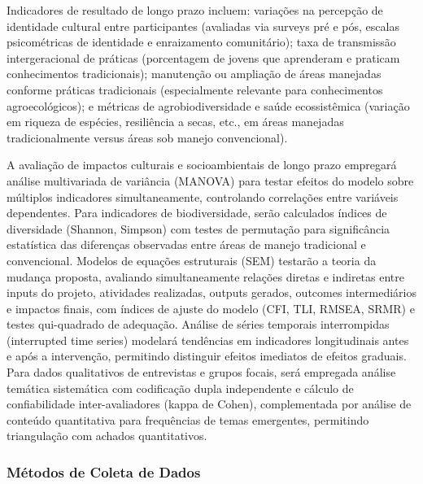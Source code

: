 Indicadores de resultado de longo prazo incluem: variações na percepção de identidade cultural entre participantes (avaliadas via surveys pré e pós, escalas psicométricas de identidade e enraizamento comunitário); taxa de transmissão intergeracional de práticas (porcentagem de jovens que aprenderam e praticam conhecimentos tradicionais); manutenção ou ampliação de áreas manejadas conforme práticas tradicionais (especialmente relevante para conhecimentos agroecológicos); e métricas de agrobiodiversidade e saúde ecossistêmica (variação em riqueza de espécies, resiliência a secas, etc., em áreas manejadas tradicionalmente versus áreas sob manejo convencional).

A avaliação de impactos culturais e socioambientais de longo prazo empregará análise multivariada de variância (MANOVA) para testar efeitos do modelo sobre múltiplos indicadores simultaneamente, controlando correlações entre variáveis dependentes. Para indicadores de biodiversidade, serão calculados índices de diversidade (Shannon, Simpson) com testes de permutação para significância estatística das diferenças observadas entre áreas de manejo tradicional e convencional. Modelos de equações estruturais (SEM) testarão a teoria da mudança proposta, avaliando simultaneamente relações diretas e indiretas entre inputs do projeto, atividades realizadas, outputs gerados, outcomes intermediários e impactos finais, com índices de ajuste do modelo (CFI, TLI, RMSEA, SRMR) e testes qui-quadrado de adequação. Análise de séries temporais interrompidas (interrupted time series) modelará tendências em indicadores longitudinais antes e após a intervenção, permitindo distinguir efeitos imediatos de efeitos graduais. Para dados qualitativos de entrevistas e grupos focais, será empregada análise temática sistemática com codificação dupla independente e cálculo de confiabilidade inter-avaliadores (kappa de Cohen), complementada por análise de conteúdo quantitativa para frequências de temas emergentes, permitindo triangulação com achados quantitativos.

\subsubsection{Métodos de Coleta de Dados}

